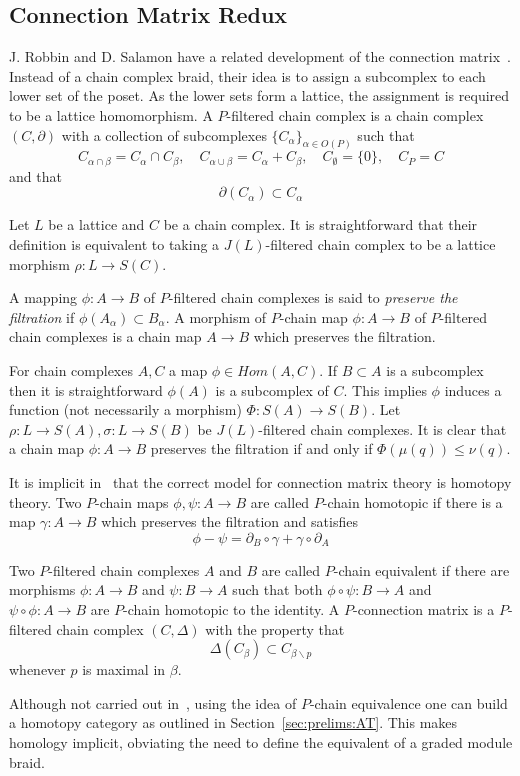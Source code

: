 \subsection{Connection Matrix Redux}

J. Robbin and D. Salamon have a related development of the connection matrix~\cite{salamon}.   Instead of a chain complex braid, their idea is to assign a subcomplex to each lower set of the poset.  As the lower sets form a lattice, the assignment is required to be a lattice homomorphism.  A $P$-filtered chain complex is a chain complex $(C,\partial)$ with a collection of subcomplexes $\{C_\alpha\}_{\alpha\in O(P)}$ such that $$C_{\alpha\cap \beta} = C_\alpha\cap C_\beta, \quad C_{\alpha\cup \beta} = C_\alpha + C_\beta,\quad C_\emptyset = \{0\},\quad C_P = C$$ and that $$\partial(C_\alpha)\subset C_\alpha$$

Let $L$ be a lattice and $C$ be a chain complex.  It is straightforward that their definition is equivalent to taking a $J(L)$-filtered chain complex to be a lattice morphism $\rho: L\to S(C)$.

A mapping $\phi:A\to B$ of $P$-filtered chain complexes is said to {\em preserve the filtration} if $\phi(A_\alpha)\subset B_\alpha$.  A morphism of $P$-chain map $\phi:A\to B$ of $P$-filtered chain complexes is a chain map $A\to B$ which preserves the filtration.

For chain complexes $A,C$ a map $\phi\in Hom(A,C)$.  If $B\subset A$ is a subcomplex then it is straightforward $\phi(A)$ is a subcomplex of $C$. This implies $\phi$ induces a function (not necessarily a morphism) $\Phi:S(A)\to S(B)$.  Let $\rho:L\to S(A),\sigma:L\to S(B)$ be $J(L)$-filtered chain complexes. It is clear that a chain map $\phi:A\to B$ preserves the filtration if and only if $\Phi(\mu(q))\leq \nu(q)$.

It is implicit in~\cite{salamon} that the correct model for connection matrix theory is homotopy theory.    Two $P$-chain maps $\phi,\psi:A\to B$ are called $P$-chain homotopic if there is a map $\gamma:A\to B$ which preserves the filtration and satisfies $$\phi-\psi = \partial_B \circ \gamma + \gamma\circ \partial_A$$

Two $P$-filtered chain complexes $A$ and $B$ are called $P$-chain equivalent if there are morphisms $\phi:A\to B$ and $\psi:B\to A$ such that both $\phi\circ \psi:B\to A$ and $\psi\circ \phi:A\to B$ are $P$-chain homotopic to the identity.   A $P$-connection matrix is a $P$-filtered chain complex $(C,\Delta)$ with the property that $$\Delta(C_\beta)\subset C_{\beta \backslash p}$$ whenever $p$ is maximal in $\beta$.  

Although not carried out in~\cite{salamon}, using the idea of $P$-chain equivalence one can build a homotopy category as outlined in Section~\ref{sec:prelims:AT}.  This makes homology implicit, obviating the need to define the equivalent of a graded module braid.  





